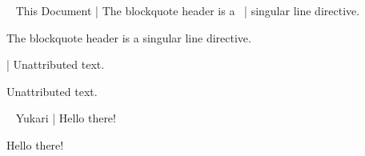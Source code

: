 \begin{examples}
  \begin{examplesource}
~ This Document
| The blockquote header is a \
| singular line directive.
  \end{examplesource}
  \begin{exampleoutput}
    \begin{blockquote}
      The blockquote header is a singular line directive.
    \end{blockquote}
  \end{exampleoutput}
  \begin{examplesource}
| Unattributed text.
  \end{examplesource}
  \begin{exampleoutput}
    \begin{blockquote}
      Unattributed text.
    \end{blockquote}
  \end{exampleoutput}
  \begin{examplesource}
~ Yukari | Hello there!
  \end{examplesource}
  \begin{exampleoutput}
    \begin{blockquote}[Yukari]
      Hello there!
    \end{blockquote}
  \end{exampleoutput}
\end{examples}

